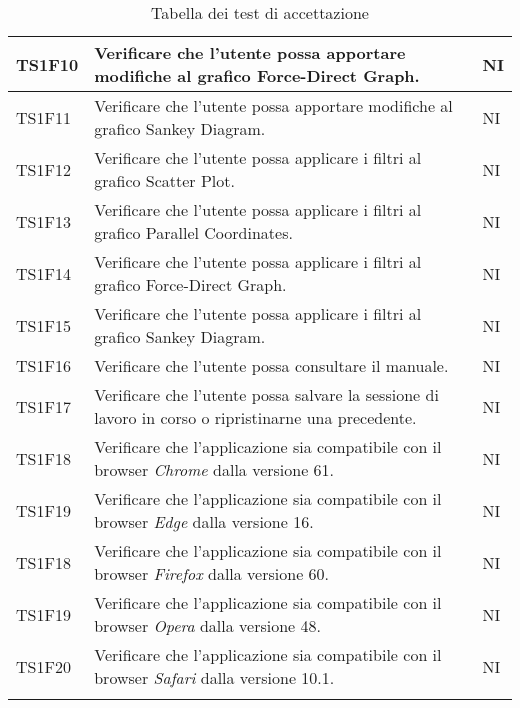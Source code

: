 \begin{center}
\begin{longtable}{|p{1.5cm}|p{11cm}|p{1cm}|}
                \rowcolor[HTML]{C0C0C0}
                TS1F10 & Verificare che l’utente possa apportare modifiche al grafico Force-Direct Graph. & NI\\ \hline
                \rowcolor[HTML]{EFEFEF}
                TS1F11 & Verificare che l’utente possa apportare modifiche al grafico Sankey Diagram. & NI\\ \hline
                \rowcolor[HTML]{C0C0C0}
                TS1F12 & Verificare che l’utente possa applicare i filtri al grafico Scatter Plot. & NI\\ \hline
                \rowcolor[HTML]{EFEFEF}
                TS1F13 & Verificare che l’utente possa applicare i filtri al grafico Parallel Coordinates. & NI\\ \hline
                \rowcolor[HTML]{C0C0C0}
                TS1F14 & Verificare che l’utente possa applicare i filtri al grafico Force-Direct Graph. & NI\\ \hline
                \rowcolor[HTML]{EFEFEF}
                TS1F15 & Verificare che l’utente possa applicare i filtri al grafico Sankey Diagram. & NI\\ \hline
                \rowcolor[HTML]{C0C0C0}
                TS1F16 & Verificare che l’utente possa consultare il manuale. & NI\\ \hline
                \rowcolor[HTML]{EFEFEF}
                TS1F17 & Verificare che l’utente possa salvare la sessione di lavoro in corso o ripristinarne una precedente. & NI\\ \hline
                \rowcolor[HTML]{C0C0C0}
                TS1F18 & Verificare che l'applicazione sia compatibile con il browser \textit{Chrome} dalla versione 61. & NI\\ \hline
                \rowcolor[HTML]{EFEFEF}
                TS1F19 & Verificare che l'applicazione sia compatibile con il browser \textit{Edge} dalla versione 16. & NI\\ \hline
                \rowcolor[HTML]{C0C0C0}
                TS1F18 & Verificare che l'applicazione sia compatibile con il browser \textit{Firefox} dalla versione 60. & NI\\ \hline
                \rowcolor[HTML]{EFEFEF}
                TS1F19 & Verificare che l'applicazione sia compatibile con il browser \textit{Opera} dalla versione 48. & NI\\ \hline
                \rowcolor[HTML]{C0C0C0}
                TS1F20 & Verificare che l'applicazione sia compatibile con il browser \textit{Safari} dalla versione 10.1. & NI\\ \hline
                \caption{Tabella dei test di accettazione}
            \end{longtable}
        \end{center}

